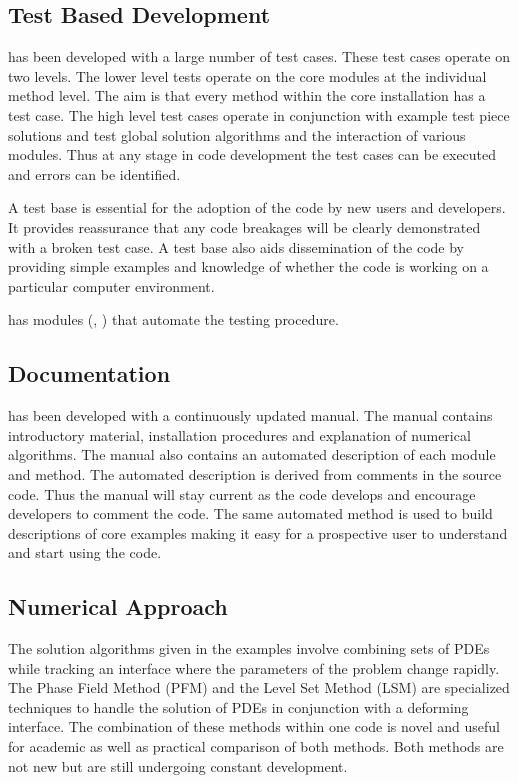 \subsection{Test Based Development}

\FiPy{} has been developed with a large number of test cases. These test
cases operate on two levels. The lower level tests operate on the core
modules at the individual method level. The aim is that every method
within the core installation has a test case. The high level test
cases operate in conjunction with example test piece solutions and
test global solution algorithms and the interaction of various
modules. Thus at any stage in code development the test cases can be
executed and errors can be identified.

A test base is essential for the adoption of the code by new users and
developers. It provides reassurance that any code breakages will be
clearly demonstrated with a broken test case. A test base also aids
dissemination of the code by providing simple examples and knowledge
of whether the code is working on a particular computer environment.

\Python{} has modules (\doctest{}, \unittest{}) that automate the
testing procedure.

\subsection{Documentation}

\FiPy{} has been developed with a continuously updated manual. The
manual contains introductory material, installation procedures and
explanation of numerical algorithms. The manual also contains an
automated description of each module and method. The automated
description is derived from comments in the source code. Thus the
manual will stay current as the code develops and encourage developers
to comment the code. The same automated method is used to build
descriptions of core examples making it easy for a prospective user to
understand and start using the code.

\subsection{Numerical Approach}

The solution algorithms given in the \FiPy{} examples involve combining
sets of PDEs while tracking an interface where the parameters of the
problem change rapidly. The Phase Field Method (PFM) and the Level Set
Method (LSM) are specialized techniques to handle the solution of
PDEs in conjunction with a deforming interface. The combination of
these methods within one code is novel and useful for academic as well
as practical comparison of both methods. Both methods are not new but
are still undergoing constant development.

